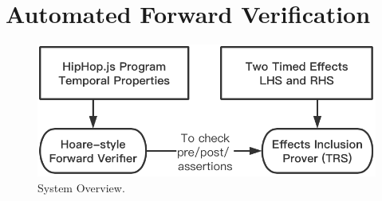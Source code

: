 \documentclass[acmsmall,10pt,review]{acmart}
\newcommand{\timedEffects}{\emph{TimEffs}}
\newcommand{\effect}{\textcolor{black}{\ensuremath{\mathrm{\Phi}}}}
\newcommand{\code}[1]{{\tt{\ensuremath{\m{#1}}}}}
\newcommand{\m}{\mathit}
\newcommand{\lappend}{\mathrel{\texttt{++}}}
\def\defeq{\ensuremath{\,\triangleq}}
\newcommand\figref[1]{Fig. \textcolor{black}{\ref{#1}}.}
\begin{document}
{



\section{Automated Forward Verification}\label{sec:Verification}




\begin{figure}
    \vspace{-3mm}
\centering
\includegraphics[width=0.5\columnwidth]{verification.png}
        \vspace{-3mm}
\caption{\label{fig:Verification_oberview}System Overview.}
      \vspace{-1mm}
\end{figure}

}
\end{document}
